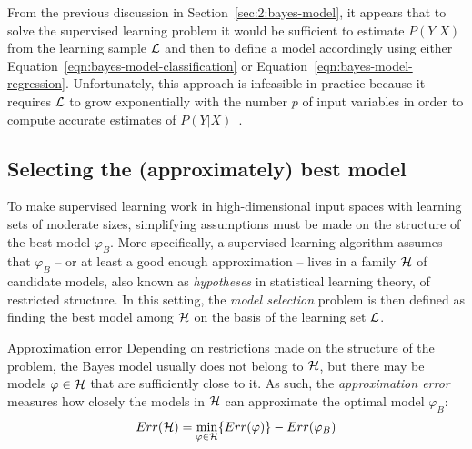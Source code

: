 From the previous discussion in Section~\ref{sec:2:bayes-model}, it appears that
to solve the supervised learning problem it would be sufficient to estimate
$P(Y|X)$ from the learning sample ${\cal L}$ and then to define a model
accordingly using either Equation~\ref{eqn:bayes-model-classification} or
Equation~\ref{eqn:bayes-model-regression}. Unfortunately, this approach is
infeasible in practice because it requires ${\cal L}$ to grow exponentially
with the number $p$ of input variables in order to compute accurate estimates of
$P(Y|X)$~\citep{geurts:2002}.

\subsection{Selecting the (approximately) best model}

To make supervised learning work in high-dimensional input spaces with learning
sets of moderate sizes, simplifying assumptions must be made on
the structure of the best model $\varphi_B$. More specifically, a supervised
learning algorithm assumes that $\varphi_B$ -- or at least a good enough approximation
-- lives in a family ${\cal H}$\label{ntn:H} of candidate models, also known as
\textit{hypotheses} in statistical learning theory, of restricted structure. In
this setting, the \textit{model selection} problem is then defined as finding
the best model among ${\cal H}$ on the basis of the learning set ${\cal L}$.

\begin{remark}{Approximation error}
Depending on restrictions made on the structure of the problem, the
Bayes model usually does not belong to ${\cal H}$, but there may be models
$\varphi \in {\cal H}$ that are sufficiently close to it. As such, the
\textit{approximation error}~\citep{bottou:2011} measures how closely the
models in ${\cal H}$ can approximate the optimal model $\varphi_B$:
\begin{equation}
Err({\cal H}) = \min_{\varphi \in {\cal H}} \{ Err(\varphi) \} - Err(\varphi_B)
\end{equation}
\end{remark}

